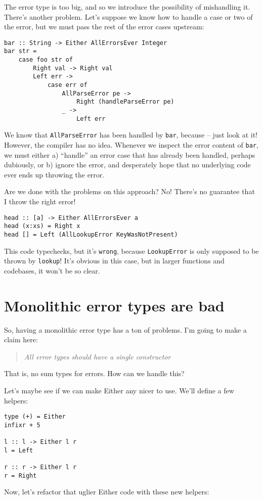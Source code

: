 The error type is too big, and so we introduce the possibility of mishandling it. There's another problem. Let's suppose we know how to handle a case or two of the error, but we must pass the rest of the error cases upstream:

\begin{verbatim}
bar :: String -> Either AllErrorsEver Integer
bar str =
    case foo str of
        Right val -> Right val
        Left err ->
            case err of
                AllParseError pe ->
                    Right (handleParseError pe)
                _ ->
                    Left err
\end{verbatim}
We know that \texttt{AllParseError} has been handled by \texttt{bar}, because -- just look at it! However, the compiler has no idea. Whenever we inspect the error content of \texttt{bar}, we must either a) ``handle'' an error case that has already been handled, perhaps dubiously, or b) ignore the error, and desperately hope that no underlying code ever ends up throwing the error.

Are we done with the problems on this approach? No! There's no guarantee that I throw the right error!

\begin{verbatim}
head :: [a] -> Either AllErrorsEver a
head (x:xs) = Right x
head [] = Left (AllLookupError KeyWasNotPresent)
\end{verbatim}
This code typechecks, but it's \texttt{wrong}, because \texttt{LookupError} is only supposed to be thrown by \texttt{lookup}! It's obvious in this case, but in larger functions and codebases, it won't be so clear.

\section{Monolithic error types are bad}

So, having a monolithic error type has a ton of problems. I'm going to make a claim here:
\begin{quotation}
\textit{All error types should have a single constructor}
\end{quotation}
That is, no sum types for errors. How can we handle this?

Let's maybe see if we can make Either any nicer to use. We'll define a few helpers:

\begin{verbatim}
type (+) = Either
infixr + 5

l :: l -> Either l r
l = Left

r :: r -> Either l r
r = Right
\end{verbatim}
Now, let's refactor that uglier Either code with these new helpers:

